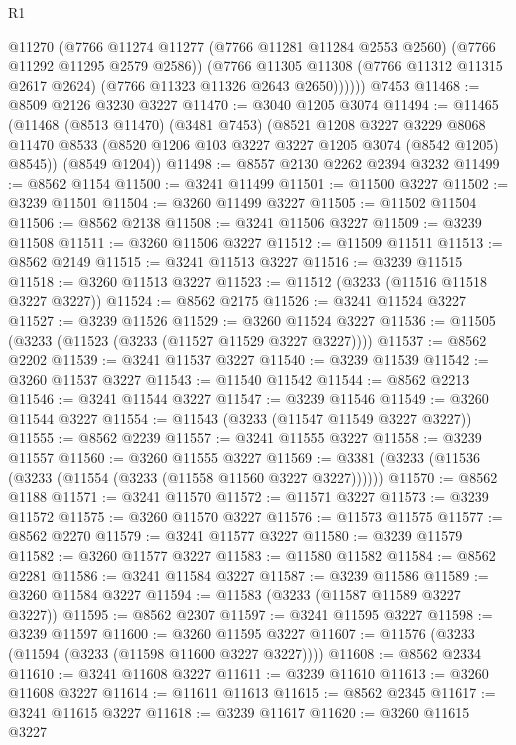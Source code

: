 \begin{lexlean}{R1}
\begin{coremodule}
            @11270
            (@7766
              @11274
              @11277
              (@7766 @11281 @11284 @2553 @2560)
              (@7766 @11292 @11295 @2579 @2586))
            (@7766
              @11305
              @11308
              (@7766 @11312 @11315 @2617 @2624)
              (@7766 @11323 @11326 @2643 @2650))))))
    @7453
@11468 := @8509 @2126 @3230 @3227
@11470 := @3040 @1205 @3074
@11494 := @11465
    (@11468
      (@8513 @11470)
      (@3481 @7453)
      (@8521
        @1208
        @3227
        @3229
        @8068
        @11470
        @8533
        (@8520 @1206 @103 @3227 @3227 @1205 @3074 (@8542 @1205) @8545))
      (@8549 @1204))
@11498 := @8557 @2130 @2262 @2394 @3232
@11499 := @8562 @1154
@11500 := @3241 @11499
@11501 := @11500 @3227
@11502 := @3239 @11501
@11504 := @3260 @11499 @3227
@11505 := @11502 @11504
@11506 := @8562 @2138
@11508 := @3241 @11506 @3227
@11509 := @3239 @11508
@11511 := @3260 @11506 @3227
@11512 := @11509 @11511
@11513 := @8562 @2149
@11515 := @3241 @11513 @3227
@11516 := @3239 @11515
@11518 := @3260 @11513 @3227
@11523 := @11512 (@3233 (@11516 @11518 @3227 @3227))
@11524 := @8562 @2175
@11526 := @3241 @11524 @3227
@11527 := @3239 @11526
@11529 := @3260 @11524 @3227
@11536 := @11505 (@3233 (@11523 (@3233 (@11527 @11529 @3227 @3227))))
@11537 := @8562 @2202
@11539 := @3241 @11537 @3227
@11540 := @3239 @11539
@11542 := @3260 @11537 @3227
@11543 := @11540 @11542
@11544 := @8562 @2213
@11546 := @3241 @11544 @3227
@11547 := @3239 @11546
@11549 := @3260 @11544 @3227
@11554 := @11543 (@3233 (@11547 @11549 @3227 @3227))
@11555 := @8562 @2239
@11557 := @3241 @11555 @3227
@11558 := @3239 @11557
@11560 := @3260 @11555 @3227
@11569 := @3381 (@3233 (@11536 (@3233 (@11554 (@3233 (@11558 @11560 @3227 @3227))))))
@11570 := @8562 @1188
@11571 := @3241 @11570
@11572 := @11571 @3227
@11573 := @3239 @11572
@11575 := @3260 @11570 @3227
@11576 := @11573 @11575
@11577 := @8562 @2270
@11579 := @3241 @11577 @3227
@11580 := @3239 @11579
@11582 := @3260 @11577 @3227
@11583 := @11580 @11582
@11584 := @8562 @2281
@11586 := @3241 @11584 @3227
@11587 := @3239 @11586
@11589 := @3260 @11584 @3227
@11594 := @11583 (@3233 (@11587 @11589 @3227 @3227))
@11595 := @8562 @2307
@11597 := @3241 @11595 @3227
@11598 := @3239 @11597
@11600 := @3260 @11595 @3227
@11607 := @11576 (@3233 (@11594 (@3233 (@11598 @11600 @3227 @3227))))
@11608 := @8562 @2334
@11610 := @3241 @11608 @3227
@11611 := @3239 @11610
@11613 := @3260 @11608 @3227
@11614 := @11611 @11613
@11615 := @8562 @2345
@11617 := @3241 @11615 @3227
@11618 := @3239 @11617
@11620 := @3260 @11615 @3227

\end{coremodule}
\end{lexlean}

